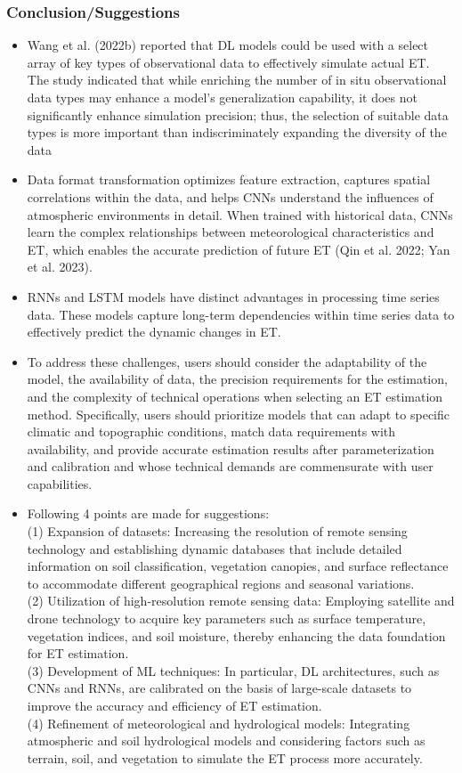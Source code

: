 \documentclass[paper=a4, fontsize=12pt]{scrartcl}
\begin{document}
	\subsubsection{Conclusion/Suggestions}
	\begin{itemize}
		\item Wang et al. (2022b) reported that DL models could be used with a select array of key types of observational data to effectively simulate actual ET. The study indicated that while enriching the number of in situ observational data types may enhance a model’s generalization capability, it does not significantly enhance simulation precision; thus, the selection of suitable data types is more important than indiscriminately expanding the diversity of the data
		\item Data format transformation optimizes feature extraction, captures spatial correlations within the data, and helps CNNs understand the influences of atmospheric environments in detail. When trained with historical data, CNNs learn the complex relationships between meteorological characteristics and ET, which enables the accurate prediction of future ET (Qin et al. 2022; Yan et al. 2023).
		\item RNNs and LSTM models have distinct advantages in processing time series data. These models capture long-term dependencies within time series data to effectively predict the dynamic changes in ET.
		\item To address these challenges, users should consider the adaptability of the model, the availability of data, the precision requirements for the estimation, and the complexity of technical operations when selecting an ET estimation method. Specifically, users should prioritize models that can adapt to specific climatic and topographic conditions, match data requirements with availability, and provide accurate estimation results after parameterization and calibration and whose technical demands are commensurate with user capabilities.
		\item Following 4 points are made for suggestions:\\
		(1) Expansion of datasets: Increasing the resolution of remote sensing technology and establishing dynamic databases that include detailed information on soil classification, vegetation canopies, and surface reflectance to accommodate different geographical regions and seasonal variations. \\
		(2) Utilization of high-resolution remote sensing data: Employing satellite and drone technology to acquire key parameters such as surface temperature, vegetation indices, and soil moisture, thereby enhancing the data foundation for ET estimation.\\ 
		(3) Development of ML techniques: In particular, DL architectures, such as CNNs and RNNs, are calibrated on the basis of large-scale datasets to improve the accuracy and efficiency of ET estimation.\\
		(4) Refinement of meteorological and hydrological models: Integrating atmospheric and soil hydrological models and considering factors such as terrain, soil, and vegetation to simulate the ET process more accurately.
	\end{itemize}
	
\end{document}
